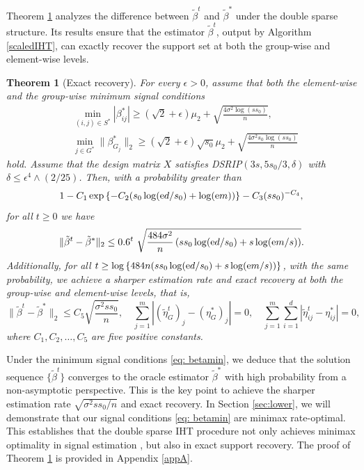 \documentclass[12pt]{article}
\newtheorem{theorem}{Theorem}
\begin{document}
Theorem \ref{T8} analyzes the difference between $\tilde \beta^t$ and $\tilde \beta^*$ under the double sparse structure.
Its results ensure that the estimator $\tilde \beta^t$, output by Algorithm \ref{scaledIHT}, can exactly recover the support set at both the group-wise and element-wise levels.
\begin{theorem}[Exact recovery]\label{T8}
    For every $\epsilon >0$, assume that both the element-wise and the group-wise minimum signal conditions 
    \begin{equation}\label{eq: betamin}
    \begin{aligned}
        &\min_{(i,j)\in S^*}|\beta^*_{ij}| \ge (\sqrt2+ \epsilon)\mu_2 + \sqrt{\frac{4\sigma^2\log(ss_0)}{n}},\\
        &\min_{j \in G^*}\|\beta^*_{G_j}\|_2 \ge (\sqrt{2}+ \epsilon) \sqrt{s_0}\mu_2+  \sqrt{\frac{4\sigma^2 s_0\log(ss_0)}{n}}
    \end{aligned}
    \end{equation}
    hold. 
    Assume that the design matrix $X$ satisfies DSRIP$(3s, 5s_0 /3, \delta)$ with $\delta \le \epsilon^4 \wedge (2/{25}) $.
Then, with a probability greater than 
$$1- C_1 \exp\left\{-C_2 (s_0 \log({\rm e} d/s_0)+ \log({\rm e} m )) \right\} -C_3 (ss_0)^{-C_4},$$
for all $ t \ge 0$ we have 
\begin{equation}\label{eq:convergence}
 \|\tilde \beta^t - \tilde \beta^* \|_2 \le 0.6^{t} ~\sqrt{ \frac{484\sigma^2}n \left( ss_0 \log({\rm e} d/s_0) + s\log({\rm e} m /s) \right)  }.
\end{equation}
Additionally, for all $ t \ge \log \left\{ 484 n (ss_0\log({\rm e} d/s_0) + s \log({\rm e} m /s) ) \right\}$, with the same probability, we achieve a sharper estimation rate and exact recovery at both the group-wise and element-wise levels, that is,
\begin{equation}
\|\tilde \beta^t - \tilde \beta^* \|_2 \le C_5 \sqrt{\frac{\sigma^2 ss_0}{n}} , \quad
  \sum_{j=1}^m\left| (\tilde \eta^t_G)_j -(\eta^*_G)_j\right|=0,\quad 
  \sum_{j=1}^m \sum_{i=1}^{d} | \tilde \eta_{ij}^t - \eta_{ij}^* | =0,
\end{equation}
where $C_1, C_2, \ldots, C_5$ are five positive constants.
\end{theorem}
Under the minimum signal conditions \eqref{eq: betamin}, we deduce that the solution sequence $ \{\tilde \beta^t \}$ converges to the oracle estimator $\tilde \beta^*$ with high probability from a non-asymptotic perspective.
This is the key point to achieve the sharper estimation rate $\sqrt{ {\sigma^2 ss_0}/{n}}$ and exact recovery.
In Section \ref{sec:lower}, we will demonstrate that our signal conditions \eqref{eq: betamin} are minimax rate-optimal. 
This establishes that the double sparse IHT procedure not only achieves minimax optimality in signal estimation \cite{ZL23}, but also in exact support recovery. 
The proof of Theorem \ref{T8} is provided in Appendix \ref{appA}.
\end{document}
